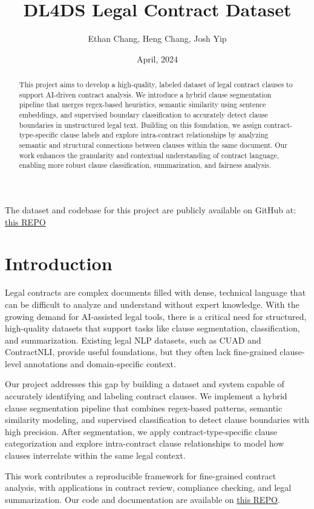 \documentclass[11pt, oneside]{article}   	%
\title{DL4DS Legal Contract Dataset}
\author{Ethan Chang, Heng Chang, Josh Yip}
\date{April, 2024}		%
\begin{document}
\maketitle
\begin{abstract}
	This project aims to develop a high-quality, labeled dataset of legal contract clauses to support AI-driven contract analysis. We introduce a hybrid clause segmentation pipeline that merges regex-based heuristics, semantic similarity using sentence embeddings, and supervised boundary classification to accurately detect clause boundaries in unstructured legal text. Building on this foundation, we assign contract-type-specific clause labels and explore intra-contract relationships by analyzing semantic and structural connections between clauses within the same document. Our work enhances the granularity and contextual understanding of contract language, enabling more robust clause classification, summarization, and fairness analysis.
\end{abstract}
The dataset and codebase for this project are publicly available on GitHub at:  
\href{https://github.com/joshyipp/542-LegalContract-AI}{this REPO}

\section*{Introduction}

Legal contracts are complex documents filled with dense, technical language that can be difficult to analyze and understand without expert knowledge. With the growing demand for AI-assisted legal tools, there is a critical need for structured, high-quality datasets that support tasks like clause segmentation, classification, and summarization. Existing legal NLP datasets, such as CUAD and ContractNLI, provide useful foundations, but they often lack fine-grained clause-level annotations and domain-specific context.

Our project addresses this gap by building a dataset and system capable of accurately identifying and labeling contract clauses. We implement a hybrid clause segmentation pipeline that combines regex-based patterns, semantic similarity modeling, and supervised classification to detect clause boundaries with high precision. After segmentation, we apply contract-type-specific clause categorization and explore intra-contract clause relationships to model how clauses interrelate within the same legal context.

This work contributes a reproducible framework for fine-grained contract analysis, with applications in contract review, compliance checking, and legal summarization. Our code and documentation are available on \href{https://github.com/joshyipp/542-LegalContract-AI}{this REPO}.
\end{document}
